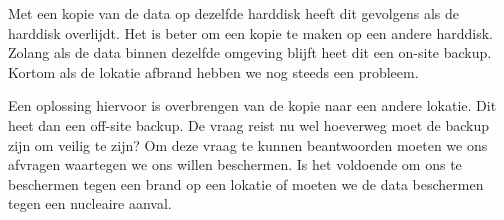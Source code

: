 Met een kopie van de data op dezelfde harddisk heeft dit gevolgens als de harddisk overlijdt. Het is beter om een kopie te maken op een andere harddisk. Zolang als de data binnen dezelfde omgeving blijft heet dit een on-site backup. Kortom als de lokatie afbrand hebben we nog steeds een probleem.

Een oplossing hiervoor is overbrengen van de kopie naar een andere lokatie. Dit heet dan een off-site backup. De vraag reist nu wel hoeverweg moet de backup zijn om veilig te zijn? Om deze vraag te kunnen beantwoorden moeten we ons afvragen waartegen we ons willen beschermen. Is het voldoende om ons te beschermen tegen een brand op een lokatie of moeten we de data beschermen tegen een nucleaire aanval.

